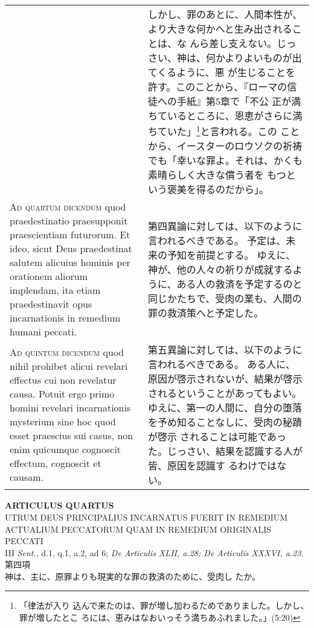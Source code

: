 \documentclass[10pt]{jsarticle} %
\begin{document}
\begin{longtable}{p{21em}p{21em}}
&

しかし、罪のあとに、人間本性が、より大きな何かへと生み出されることは、な
 んら差し支えない。じっさい、神は、何かよりよいものが出てくるように、悪
 が生じることを許す。このことから、『ローマの信徒への手紙』第5章で「不公
 正が満ちているところに、恩恵がさらに満ちていた」\footnote{「律法が入り
 込んで来たのは、罪が増し加わるためでありました。しかし、罪が増したとこ
 ろには、恵みはなおいっそう満ちあふれました。」(5:20) }と言われる。この
 ことから、イースターのロウソクの祈祷でも「幸いな罪よ。それは、かくも素晴らしく大きな償う者を
 もつという褒美を得るのだから」。


\\


{\scshape Ad quartum dicendum} quod praedestinatio
praesupponit praescientiam futurorum. Et ideo, sicut Deus praedestinat
salutem alicuius hominis per orationem aliorum implendam, ita etiam
praedestinavit opus incarnationis in remedium humani peccati.


&

第四異論に対しては、以下のように言われるべきである。
予定は、未来の予知を前提とする。
ゆえに、神が、他の人々の祈りが成就するように、ある人の救済を予定するのと
 同じかたちで、受肉の業も、人間の罪の救済策へと予定した。


\\


{\scshape Ad quintum dicendum} quod nihil prohibet
alicui revelari effectus cui non revelatur causa. Potuit ergo primo
homini revelari incarnationis mysterium sine hoc quod esset praescius
sui casus, non enim quicumque cognoscit effectum, cognoscit et causam.


&

第五異論に対しては、以下のように言われるべきである。
ある人に、原因が啓示されないが、結果が啓示されるということがあってもよい。
 ゆえに、第一の人間に、自分の堕落を予め知ることなしに、受肉の秘蹟が啓示
 されることは可能であった。じっさい、結果を認識する人が皆、原因を認識す
 るわけではない。


\end{longtable}
\newpage


\begin{center}
 {\Large {\bf ARTICULUS QUARTUS}}\\
 {\large UTRUM DEUS PRINCIPALIUS INCARNATUS FUERIT IN REMEDIUM ACTUALIUM
 PECCATORUM QUAM IN REMEDIUM ORIGINALIS PECCATI}\\
 {\footnotesize III {\itshape Sent.}, d.1, q.1, a.2, ad 6; {\itshape De
 Articulis XLII, a.28; {\itshape De Articulis XXXVI}, a.23.}}\\
 {\Large 第四項\\神は、主に、原罪よりも現実的な罪の救済のために、受肉し
 たか。}
\end{center}
\end{document}
